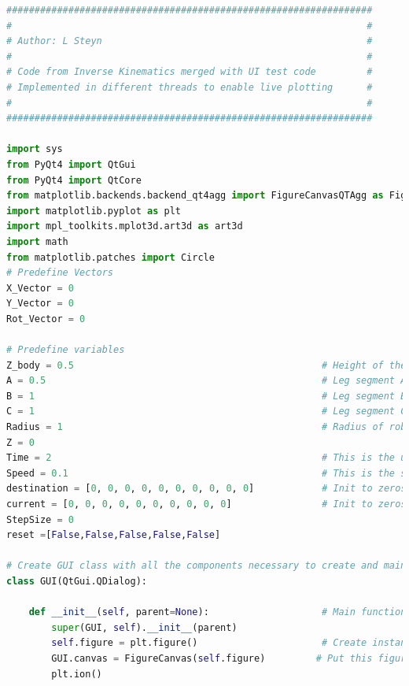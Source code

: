 \begin{lstlisting}[language = python]
#################################################################
#                                                               #
# Author: L Steyn                                               #
#                                                               #
# Code from Inverse Kinematics merged with UI test code         #
# Implemented in different threads to enable live plotting      #
#                                                               #
#################################################################

import sys
from PyQt4 import QtGui
from PyQt4 import QtCore
from matplotlib.backends.backend_qt4agg import FigureCanvasQTAgg as FigureCanvas
import matplotlib.pyplot as plt
import mpl_toolkits.mplot3d.art3d as art3d
import math
from matplotlib.patches import Circle
# Predefine Vectors
X_Vector = 0
Y_Vector = 0
Rot_Vector = 0

# Predefine variables
Z_body = 0.5                                            # Height of the robot body
A = 0.5                                                 # Leg segment A length
B = 1                                                   # Leg segment B length
C = 1                                                   # Leg segment C length
Radius = 1                                              # Radius of robot body
Z = 0
Time = 2                                                # This is the update frequency of the system in seconds
Speed = 0.1                                             # This is the speed of the robot (normalized)
destination = [0, 0, 0, 0, 0, 0, 0, 0, 0, 0]            # Init to zeros
current = [0, 0, 0, 0, 0, 0, 0, 0, 0, 0]                # Init to zeros
StepSize = 0
reset =[False,False,False,False,False]

# Create GUI class with all the components necessary to create and maintain the GUI
class GUI(QtGui.QDialog):

    def __init__(self, parent=None):                    # Main function of the GUI class. Inits everything
        super(GUI, self).__init__(parent)
        self.figure = plt.figure()                      # Create instance of matplotlib figure for GUI
        GUI.canvas = FigureCanvas(self.figure)         # Put this figure on a canvas object
        plt.ion()


\end{lstlisting}
